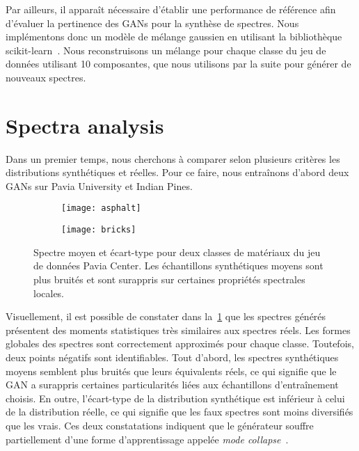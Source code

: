 Par ailleurs, il apparaît nécessaire d'établir une performance de référence afin d'évaluer la pertinence des \glspl{GAN} pour la synthèse de spectres. Nous implémentons donc un modèle de mélange gaussien en utilisant la bibliothèque scikit-learn~\cite{pedregosa_scikit-learn_2011}. Nous reconstruisons un mélange pour chaque classe du jeu de données utilisant 10 composantes, que nous utilisons par la suite pour générer de nouveaux spectres.

\section{Spectra analysis}
\label{sec:analysis}

Dans un premier temps, nous cherchons à comparer selon plusieurs critères les distributions synthétiques et réelles. Pour ce faire, nous entraînons d'abord deux \glspl{GAN} sur Pavia University et Indian Pines.

\begin{figure}
\begin{subfigure}{0.5\textwidth}
\texttt{[image: asphalt]}
\end{subfigure}%
\begin{subfigure}{0.5\textwidth}
\texttt{[image: bricks]}
\end{subfigure}
\caption{Spectre moyen et écart-type pour deux classes de matériaux du jeu de données Pavia Center. Les échantillons synthétiques moyens sont plus bruités et sont surappris sur certaines propriétés spectrales locales.}
\label{fig:mean_spectra}
\end{figure}

Visuellement, il est possible de constater dans la~\cref{fig:mean_spectra} que les spectres générés présentent des moments statistiques très similaires aux spectres réels. Les formes globales des spectres sont correctement approximés pour chaque classe. Toutefois, deux points négatifs sont identifiables. Tout d'abord, les spectres synthétiques moyens semblent plus bruités que leurs équivalents réels, ce qui signifie que le \gls{GAN} a surappris certaines particularités liées aux échantillons d'entraînement choisis. En outre, l'écart-type de la distribution synthétique est inférieur à celui de la distribution réelle, ce qui signifie que les faux spectres sont moins diversifiés que les vrais. Ces deux constatations indiquent que le générateur souffre partiellement d'une forme d'apprentissage appelée \emph{mode collapse}~\cite{salimans_improved_2016}.

